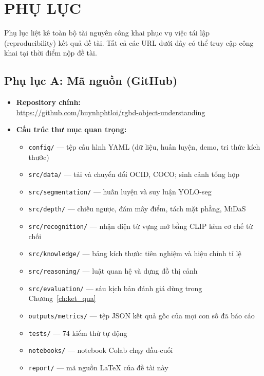 \chapter*{PHỤ LỤC}

Phụ lục liệt kê toàn bộ tài nguyên công khai phục vụ việc tái lập (reproducibility) kết quả đề
tài. Tất cả các URL dưới đây có thể truy cập công khai tại thời điểm nộp đề tài.

\section*{Phụ lục A: Mã nguồn (GitHub)}
\label{app:github}

\begin{itemize}[leftmargin=1.5cm]
\item \textbf{Repository chính:}\\
\url{https://github.com/huynhphtloi/rgbd-object-understanding}
\item \textbf{Cấu trúc thư mục quan trọng:}
\begin{itemize}
\item \texttt{config/} --- tệp cấu hình YAML (dữ liệu, huấn luyện, demo, tri thức kích thước)
\item \texttt{src/data/} --- tải và chuyển đổi OCID, COCO; sinh cảnh tổng hợp
\item \texttt{src/segmentation/} --- huấn luyện và suy luận YOLO-seg
\item \texttt{src/depth/} --- chiếu ngược, đám mây điểm, tách mặt phẳng, MiDaS
\item \texttt{src/recognition/} --- nhận diện từ vựng mở bằng CLIP kèm cơ chế từ chối
\item \texttt{src/knowledge/} --- bảng kích thước tiên nghiệm và hiệu chỉnh tỉ lệ
\item \texttt{src/reasoning/} --- luật quan hệ và dựng đồ thị cảnh
\item \texttt{src/evaluation/} --- sáu kịch bản đánh giá dùng trong Chương~\ref{ch:ket_qua}
\item \texttt{outputs/metrics/} --- tệp JSON kết quả gốc của mọi con số đã báo cáo
\item \texttt{tests/} --- 74 kiểm thử tự động
\item \texttt{notebooks/} --- notebook Colab chạy đầu-cuối
\item \texttt{report/} --- mã nguồn \LaTeX{} của đề tài này
\end{itemize}
\end{itemize}

